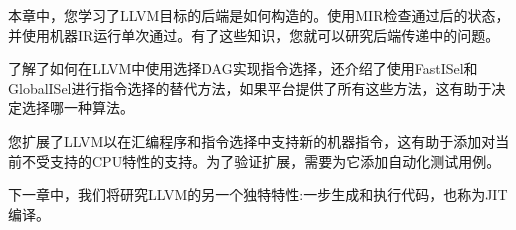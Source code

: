 本章中，您学习了LLVM目标的后端是如何构造的。使用MIR检查通过后的状态，并使用机器IR运行单次通过。有了这些知识，您就可以研究后端传递中的问题。\par

了解了如何在LLVM中使用选择DAG实现指令选择，还介绍了使用FastISel和GlobalISel进行指令选择的替代方法，如果平台提供了所有这些方法，这有助于决定选择哪一种算法。\par

您扩展了LLVM以在汇编程序和指令选择中支持新的机器指令，这有助于添加对当前不受支持的CPU特性的支持。为了验证扩展，需要为它添加自动化测试用例。\par

下一章中，我们将研究LLVM的另一个独特特性:一步生成和执行代码，也称为JIT编译。\par

\newpage